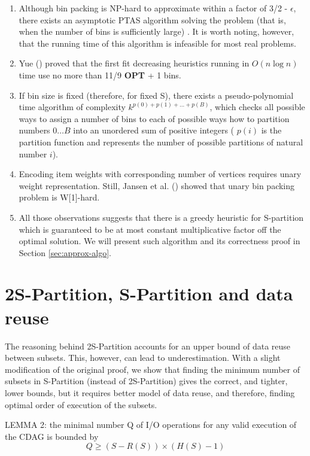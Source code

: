 \documentclass[sigconf]{acmart}
\begin{document}
\begin{enumerate}
	\item Although bin packing is NP-hard to approximate within a factor of 3/2 
	- $\epsilon$, there exists an asymptotic PTAS algorithm solving the problem 
	(that is, when the number of bins is sufficiently large) 
	\cite{binpackingPTAS}. It is worth noting, however, that the running time 
	of this algorithm is infeasible for most real problems.
	\item Yue (\cite{binpackingApprox}) proved that the first fit decreasing 
	heuristics running in $O(n \log 
	n)$ time use no more than 11/9 \textbf{OPT} + 1 bins.
	\item If bin size is fixed (therefore, for fixed S), there exists a 
	pseudo-polynomial time algorithm 
	of complexity $k^{p(0)+p(1)+\dots+p(B)}$, which checks all possible ways to 
	assign a number of bins to each of possible ways how to partition numbers 
	$0 \dots B$ into an unordered sum of positive integers ( $p(i)$ is the 
	partition function and represents the number of possible partitions of 
	natural number $i$).
	\item Encoding item weights with corresponding number of vertices requires 
	unary weight representation. Still, Jansen et al. 
	(\cite{unaryBinPacking}) showed that unary bin packing problem is W[1]-hard.
	\item All those observations suggests that there is a greedy 
	heuristic for S-partition which is guaranteed to be at most constant 
	multiplicative factor off the optimal solution. We will present such 
	algorithm and its correctness proof in Section \ref{sec:approx-algo}.
\end{enumerate}

	\section{2S-Partition, S-Partition and data reuse}
\label{sec:Svs2S}
The reasoning behind 2S-Partition accounts for an upper bound of data 
reuse 
between subsets.
This, however, can lead to underestimation. With a slight modification of 
the original proof, we show that finding the minimum number of subsets in 
S-Partition 
(instead of 
2S-Partition) gives the correct, and tighter, lower bounds, but it 
requires better model of data reuse, and therefore, finding optimal order 
of execution of the subsets.

LEMMA 2:
the minimal number Q of I/O operations for any valid execution of the CDAG 
is bounded by	
\begin{equation}
Q \ge (S - R(S)) \times (H(S) - 1)
	\label{eq:reusebound}
\end{equation}
\end{document}
